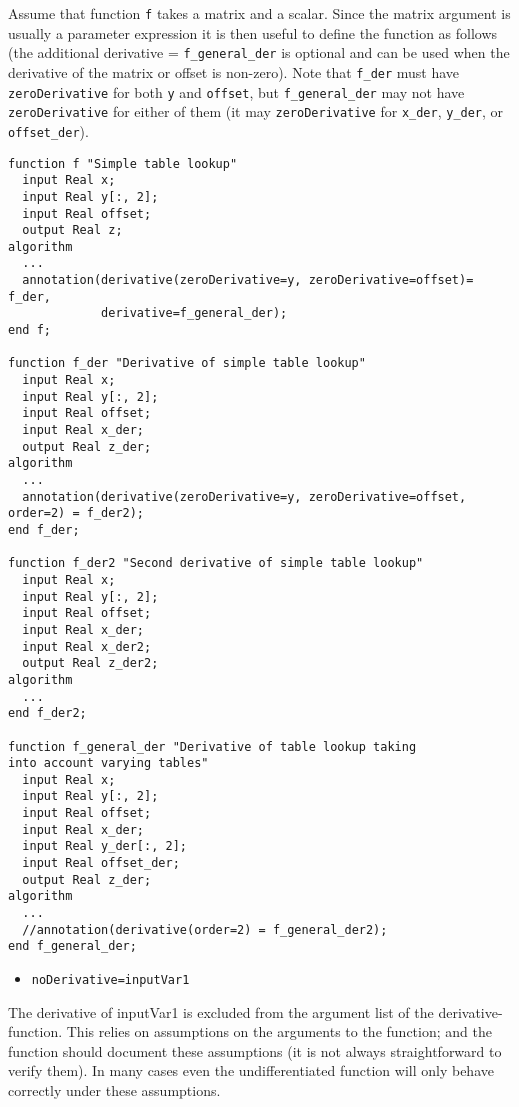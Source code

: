 \begin{nonnormative}
Assume that function \lstinline!f! takes a matrix and a scalar.
Since the matrix argument is usually a parameter expression it is then
useful to define the function as follows (the additional derivative =
\lstinline!f_general_der! is optional and can be used when the derivative of
the matrix or offset is non-zero). Note that \lstinline!f_der! must have
\lstinline!zeroDerivative! for both \lstinline!y! and \lstinline!offset!, but \lstinline!f_general_der! may not have
\lstinline!zeroDerivative! for either of them (it may \lstinline!zeroDerivative! for \lstinline!x_der!,
\lstinline!y_der!, or \lstinline!offset_der!).

\begin{lstlisting}[language=modelica]
function f "Simple table lookup"
  input Real x;
  input Real y[:, 2];
  input Real offset;
  output Real z;
algorithm
  ...
  annotation(derivative(zeroDerivative=y, zeroDerivative=offset)= f_der,
             derivative=f_general_der);
end f;

function f_der "Derivative of simple table lookup"
  input Real x;
  input Real y[:, 2];
  input Real offset;
  input Real x_der;
  output Real z_der;
algorithm
  ...
  annotation(derivative(zeroDerivative=y, zeroDerivative=offset, order=2) = f_der2);
end f_der;

function f_der2 "Second derivative of simple table lookup"
  input Real x;
  input Real y[:, 2];
  input Real offset;
  input Real x_der;
  input Real x_der2;
  output Real z_der2;
algorithm
  ...
end f_der2;

function f_general_der "Derivative of table lookup taking
into account varying tables"
  input Real x;
  input Real y[:, 2];
  input Real offset;
  input Real x_der;
  input Real y_der[:, 2];
  input Real offset_der;
  output Real z_der;
algorithm
  ...
  //annotation(derivative(order=2) = f_general_der2);
end f_general_der;
\end{lstlisting}
\end{nonnormative}

\begin{itemize}
\item
  \lstinline!noDerivative=inputVar1!
\end{itemize}

The derivative of inputVar1 is excluded from the argument list of the
derivative-function. This relies on assumptions on the arguments to the
function; and the function should document these assumptions (it is not
always straightforward to verify them). In many cases even the
undifferentiated function will only behave correctly under these
assumptions.

